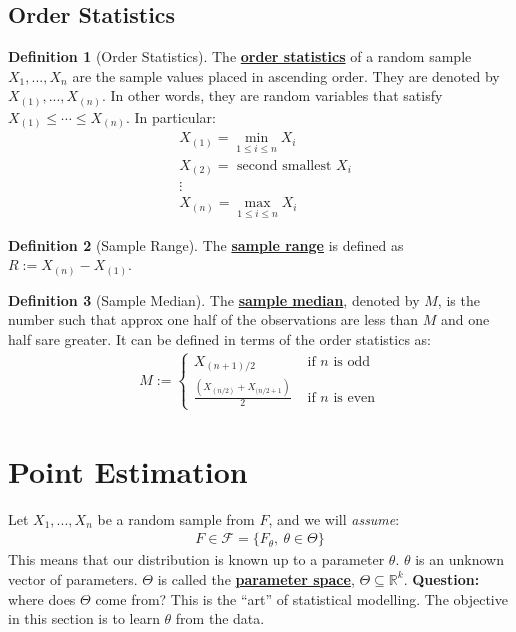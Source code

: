 \documentclass[11pt]{scrartcl}
\newcommand{\R}[0]{\mathbb{R}}
\theoremstyle{definition}
\newtheorem{definition}{Definition}
\theoremstyle{remark}
\newcommand{\dfn}[1]{\textbf{\underline{#1}}}
\newcommand{\dist}[0]{\mathcal{F}}
\begin{document}
\subsection{Order Statistics}
\begin{definition}[Order Statistics]
	The \dfn{order statistics} of a random sample $X_1, ..., X_n$ are the sample values placed in ascending order. They are denoted by $X_{(1)}, ..., X_{(n)}$. In other words, they are random variables that satisfy $X_{(1)} \leq \cdots \leq X_{(n)}$. In particular: 
	\begin{align*}
		& X_{(1)} = \min_{1 \leq i \leq n} X_i \\
		& X_{(2)} = \text{ second smallest } X_i \\
		& \vdots 	\\
		& X_{(n)} = \max_{1 \leq i \leq n } X_i 
	\end{align*}
\end{definition}


\begin{definition}[Sample Range]
	The \dfn{sample range} is defined as $R:= X_{(n)} - X_{(1)}$. 
\end{definition}

\begin{definition}[Sample Median]
	The \dfn{sample median}, denoted by $M$, is the number such that approx one half of the observations are less than $M$ and one half sare greater. It can be defined in terms of the order statistics as: 
	\begin{align*}
		M := \begin{cases}
			X_{(n+1)/2} & \text{ if $n$ is odd} \\
			\frac{(X_{(n/2)} + X_{(n/2+1})}{2} & \text{ if $n$ is even}
		\end{cases}	
	\end{align*}
\end{definition}

\section{Point Estimation}
Let $X_1, ..., X_n$ be a random sample from $F$, and we will \emph{assume}: 
\begin{align*}
F \in \dist = \{ F_\theta,\ \theta \in \Theta \} 
\end{align*}
This means that our distribution is known up to a parameter $\theta$. $\theta$ is an unknown vector of parameters. $\Theta$ is called the \dfn{parameter space}, $\Theta \subseteq \R^k$. \textbf{Question:} where does $\Theta$ come from? This is the ``art'' of statistical modelling. The objective in this section is to learn $\theta$ from the data. 
\end{document}

